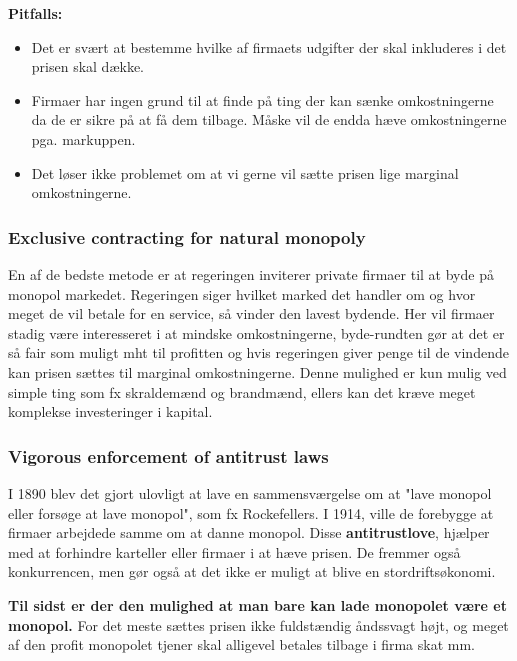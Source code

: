 \textbf{Pitfalls:}
\begin{itemize}
    \item Det er svært at bestemme hvilke af firmaets udgifter der skal inkluderes i det prisen skal dække. 
    \item Firmaer har ingen grund til at finde på ting der kan sænke omkostningerne da de er sikre på at få dem tilbage. Måske vil de endda hæve omkostningerne pga. markuppen. 
    \item Det løser ikke problemet om at vi gerne vil sætte prisen lige marginal omkostningerne. 
\end{itemize}

\subsubsection{Exclusive contracting for natural monopoly}
En af de bedste metode er at regeringen inviterer private firmaer til at byde på monopol markedet. Regeringen siger hvilket marked det handler om og hvor meget de vil betale for en service, så vinder den lavest bydende. Her vil firmaer stadig være interesseret i at mindske omkostningerne, byde-rundten gør at det er så fair som muligt mht til profitten og hvis regeringen giver penge til de vindende kan prisen sættes til marginal omkostningerne. Denne mulighed er kun mulig ved simple ting som fx skraldemænd og brandmænd, ellers kan det kræve meget komplekse investeringer i kapital.

\subsubsection{Vigorous enforcement of antitrust laws}
I 1890 blev det gjort ulovligt at lave en sammensværgelse om at "lave monopol eller forsøge at lave monopol", som fx Rockefellers. I 1914, ville de forebygge at firmaer arbejdede samme om at danne monopol. Disse \textbf{antitrustlove}, hjælper med at forhindre karteller eller firmaer i at hæve prisen. De fremmer også konkurrencen, men gør også at det ikke er muligt at blive en stordriftsøkonomi. 

\textbf{Til sidst er der den mulighed at man bare kan lade monopolet være et monopol.} For det meste sættes prisen ikke fuldstændig åndssvagt højt, og meget af den profit monopolet tjener skal alligevel betales tilbage i firma skat mm. 









